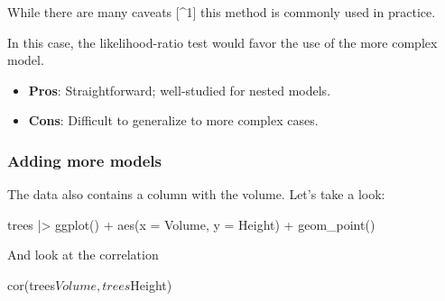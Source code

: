 \documentclass[
  letterpaper,
  DIV=11,
  numbers=noendperiod]{scrreprt}
\newenvironment{Shaded}{\begin{snugshade}}{\end{snugshade}}
\newcommand{\NormalTok}[1]{\textcolor[rgb]{0.00,0.23,0.31}{#1}}
\providecommand{\tightlist}{%
  \setlength{\itemsep}{0pt}\setlength{\parskip}{0pt}}\usepackage{longtable,booktabs,array}
\begin{document}
While there are many caveats {[}\^{}1{]} this method is commonly used in
practice.

\begin{Shaded}
\end{Shaded}

In this case, the likelihood-ratio test would favor the use of the more
complex model.

\begin{itemize}
\tightlist
\item
  \textbf{Pros}: Straightforward; well-studied for nested models.
\item
  \textbf{Cons}: Difficult to generalize to more complex cases.
\end{itemize}

\subsubsection{Adding more models}\label{adding-more-models}

The data also contains a column with the volume. Let's take a look:

\begin{Shaded}
\begin{Highlighting}[]
\NormalTok{trees |\textgreater{} ggplot() + aes(x = Volume, y = Height) + geom\_point()}
\end{Highlighting}
\end{Shaded}

And look at the correlation

\begin{Shaded}
\begin{Highlighting}[]
\NormalTok{cor(trees$Volume, trees$Height)}
\end{Highlighting}
\end{Shaded}
\end{document}
